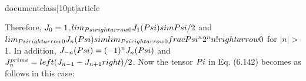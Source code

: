 \\documentclass[10pt]{article}
\begin{document}
{{{{Therefore, $J_{0}=1, \\lim _{\\Psi \\rightarrow 0} J_{1}(\\Psi) \\sim \\Psi / 2$ and $\\lim _{\\Psi \\rightarrow 0} J_{n}(\\Psi) \\sim \\lim _{\\Psi \\rightarrow 0} \\frac{\\Psi^{n}}{2^{n} n !} \\rightarrow 0$ for $|n|>$ 1. In addition, $J_{-n}(\\Psi)=(-1)^{n} J_{n}(\\Psi)$ and $J_{n}^{\\prime}=\\left(J_{n-1}-J_{n+1}\\right) / 2$. Now the tensor $\\Pi$ in Eq. (6.142) becomes as follows in this case:

}}}}
\end{document}
